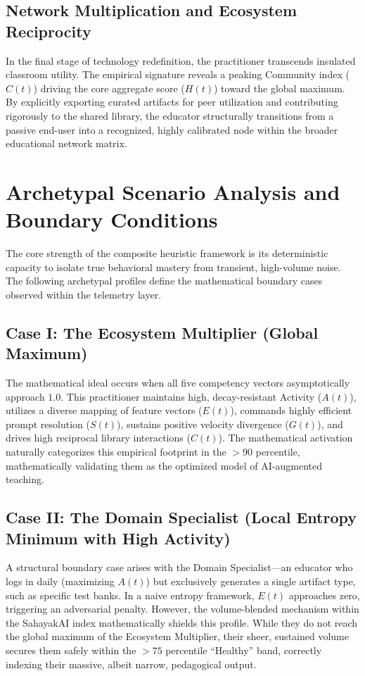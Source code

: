 \documentclass[11pt,a4paper]{article}
\begin{document}
\subsection{Network Multiplication and Ecosystem Reciprocity}
In the final stage of technology redefinition, the practitioner transcends insulated classroom utility. The empirical signature reveals a peaking Community index ($C(t)$) driving the core aggregate score ($H(t)$) toward the global maximum. By explicitly exporting curated artifacts for peer utilization and contributing rigorously to the shared library, the educator structurally transitions from a passive end-user into a recognized, highly calibrated node within the broader educational network matrix.

\section{Archetypal Scenario Analysis and Boundary Conditions}

The core strength of the composite heuristic framework is its deterministic capacity to isolate true behavioral mastery from transient, high-volume noise. The following archetypal profiles define the mathematical boundary cases observed within the telemetry layer.

\subsection{Case I: The Ecosystem Multiplier (Global Maximum)}
The mathematical ideal occurs when all five competency vectors asymptotically approach $1.0$. This practitioner maintains high, decay-resistant Activity ($A(t)$), utilizes a diverse mapping of feature vectors ($E(t)$), commands highly efficient prompt resolution ($S(t)$), sustains positive velocity divergence ($G(t)$), and drives high reciprocal library interactions ($C(t)$). The mathematical activation naturally categorizes this empirical footprint in the $>90$ percentile, mathematically validating them as the optimized model of AI-augmented teaching.

\subsection{Case II: The Domain Specialist (Local Entropy Minimum with High Activity)}
A structural boundary case arises with the Domain Specialist---an educator who logs in daily (maximizing $A(t)$) but exclusively generates a single artifact type, such as specific test banks. In a naive entropy framework, $E(t)$ approaches zero, triggering an adversarial penalty. However, the volume-blended mechanism within the SahayakAI index mathematically shields this profile. While they do not reach the global maximum of the Ecosystem Multiplier, their sheer, sustained volume secures them safely within the $>75$ percentile ``Healthy'' band, correctly indexing their massive, albeit narrow, pedagogical output.
\end{document}
